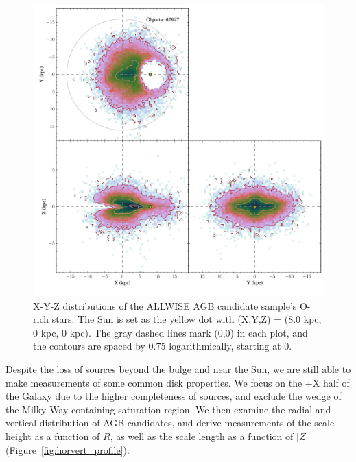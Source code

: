\begin{figure}[h]
\centering
\includegraphics[width=5in]{figs/orich_candidates_xyz.pdf}
\caption{{\footnotesize X-Y-Z distributions of the ALLWISE AGB candidate sample's O-rich stars. The Sun is set as the yellow dot with (X,Y,Z) = (8.0 kpc, 0 kpc, 0 kpc). The gray dashed lines mark (0,0) in each plot, and the contours are spaced by 0.75 logarithmically, starting at 0.}}
\label{fig:xyz_candidates}
\end{figure}

Despite the loss of sources beyond the bulge and near the Sun, we are still able to make measurements of some common disk properties. We focus on the +X half of the Galaxy due to the higher completeness of sources, and exclude the wedge of the Milky Way containing saturation region. We then examine the radial and vertical distribution of AGB candidates, and derive measurements of the scale height as a function of $R$, as well as the scale length as a function of $\lvert Z\rvert$ (Figure~\ref{fig:horvert_profile}).

